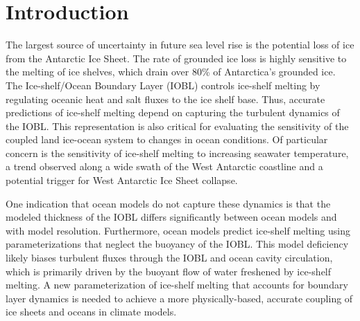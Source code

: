 \documentclass[draft]{agujournal2019}
\begin{document}
\section{Introduction}

The largest source of uncertainty in future sea level rise is the potential loss of ice from the Antarctic Ice Sheet. The rate of grounded ice loss is highly sensitive to the melting of ice shelves, which drain over 80\% of Antarctica’s grounded ice. The Ice-shelf/Ocean Boundary Layer (IOBL) controls ice-shelf melting by regulating oceanic heat and salt fluxes to the ice shelf base. Thus, accurate predictions of ice-shelf melting depend on capturing the turbulent dynamics of the IOBL. This representation is also critical for evaluating the sensitivity of the coupled land ice-ocean system to changes in ocean conditions. Of particular concern is the sensitivity of ice-shelf melting to increasing seawater temperature, a trend observed along a wide swath of the West Antarctic coastline and a potential trigger for West Antarctic Ice Sheet collapse. 

One indication that ocean models do not capture these dynamics is that the modeled thickness of the IOBL differs significantly between ocean models and with model resolution. Furthermore, ocean models predict ice-shelf melting using parameterizations that neglect the buoyancy of the IOBL. This model deficiency likely biases turbulent fluxes through the IOBL and ocean cavity circulation, which is primarily driven by the buoyant flow of water freshened by ice-shelf melting. A new parameterization of ice-shelf melting that accounts for boundary layer dynamics is needed to achieve a more physically-based, accurate coupling of ice sheets and oceans in climate models.
\end{document}
